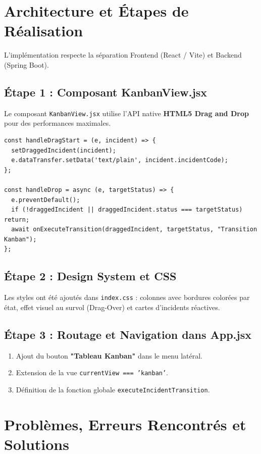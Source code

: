 \documentclass[11pt,a4paper]{article}
\begin{document}
\section{Architecture et Étapes de Réalisation}

L'implémentation respecte la séparation Frontend (React / Vite) et Backend (Spring Boot).

\subsection{Étape 1 : Composant KanbanView.jsx}
Le composant \texttt{KanbanView.jsx} utilise l'API native \textbf{HTML5 Drag and Drop} pour des performances maximales.

\begin{verbatim}
const handleDragStart = (e, incident) => {
  setDraggedIncident(incident);
  e.dataTransfer.setData('text/plain', incident.incidentCode);
};

const handleDrop = async (e, targetStatus) => {
  e.preventDefault();
  if (!draggedIncident || draggedIncident.status === targetStatus) return;
  await onExecuteTransition(draggedIncident, targetStatus, "Transition Kanban");
};
\end{verbatim}

\subsection{Étape 2 : Design System et CSS}
Les styles ont été ajoutés dans \texttt{index.css} : colonnes avec bordures colorées par état, effet visuel au survol (Drag-Over) et cartes d'incidents réactives.

\subsection{Étape 3 : Routage et Navigation dans App.jsx}
\begin{enumerate}
    \item Ajout du bouton \textbf{"Tableau Kanban"} dans le menu latéral.
    \item Extension de la vue \texttt{currentView === 'kanban'}.
    \item Définition de la fonction globale \texttt{executeIncidentTransition}.
\end{enumerate}

\section{Problèmes, Erreurs Rencontrés et Solutions}
\end{document}
